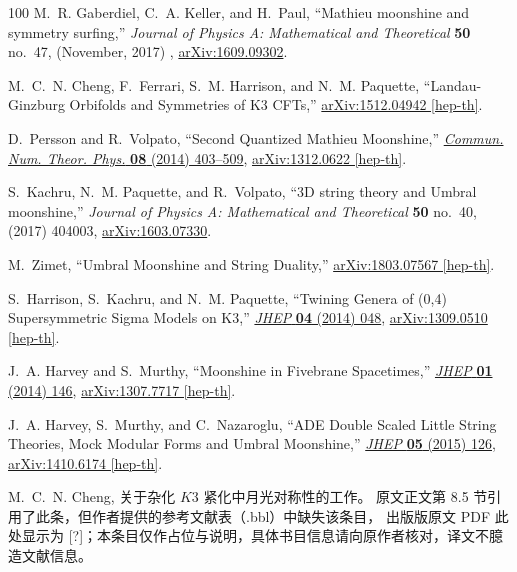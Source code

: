 \begin{thebibliography}{100}
M.~R. Gaberdiel, C.~A. Keller, and H.~Paul, ``Mathieu moonshine and symmetry
  surfing,'' {\em Journal of Physics A: Mathematical and Theoretical}
  {\bfseries 50} no.~47, (November, 2017) ,
  \href{http://arxiv.org/abs/arXiv:1609.09302}{{\ttfamily arXiv:1609.09302}}.

M.~C.~N. Cheng, F.~Ferrari, S.~M. Harrison, and N.~M. Paquette,
  ``{Landau-Ginzburg Orbifolds and Symmetries of K3 CFTs},''
\href{http://arxiv.org/abs/1512.04942}{{\ttfamily arXiv:1512.04942 [hep-th]}}.

D.~Persson and R.~Volpato, ``{Second Quantized Mathieu Moonshine},''
  \href{http://dx.doi.org/10.4310/CNTP.2014.v8.n3.a2}{{\em Commun. Num. Theor.
  Phys.} {\bfseries 08} (2014) 403--509},
\href{http://arxiv.org/abs/1312.0622}{{\ttfamily arXiv:1312.0622 [hep-th]}}.

S.~Kachru, N.~M. Paquette, and R.~Volpato, ``{3D string theory and Umbral
  moonshine},'' {\em Journal of Physics A: Mathematical and Theoretical}
  {\bfseries 50} no.~40, (2017) 404003,
  \href{http://arxiv.org/abs/arXiv:1603.07330}{{\ttfamily arXiv:1603.07330}}.

M.~Zimet, ``{Umbral Moonshine and String Duality},''
\href{http://arxiv.org/abs/1803.07567}{{\ttfamily arXiv:1803.07567 [hep-th]}}.

S.~Harrison, S.~Kachru, and N.~M. Paquette, ``{Twining Genera of (0,4)
  Supersymmetric Sigma Models on K3},''
  \href{http://dx.doi.org/10.1007/JHEP04(2014)048}{{\em JHEP} {\bfseries 04}
  (2014) 048},
\href{http://arxiv.org/abs/1309.0510}{{\ttfamily arXiv:1309.0510 [hep-th]}}.

J.~A. Harvey and S.~Murthy, ``{Moonshine in Fivebrane Spacetimes},''
  \href{http://dx.doi.org/10.1007/JHEP01(2014)146}{{\em JHEP} {\bfseries 01}
  (2014) 146},
\href{http://arxiv.org/abs/1307.7717}{{\ttfamily arXiv:1307.7717 [hep-th]}}.

J.~A. Harvey, S.~Murthy, and C.~Nazaroglu, ``{ADE Double Scaled Little String
  Theories, Mock Modular Forms and Umbral Moonshine},''
  \href{http://dx.doi.org/10.1007/JHEP05(2015)126}{{\em JHEP} {\bfseries 05}
  (2015) 126},
\href{http://arxiv.org/abs/1410.6174}{{\ttfamily arXiv:1410.6174 [hep-th]}}.

M.~C.~N. Cheng, 关于杂化 $K3$ 紧化中月光对称性的工作。
 原文正文第 8.5 节引用了此条，但作者提供的参考文献表（.bbl）中缺失该条目，
  出版版原文 PDF 此处显示为 [?]；本条目仅作占位与说明，具体书目信息请向原作者核对，译文不臆造文献信息。

\end{thebibliography}\endgroup
